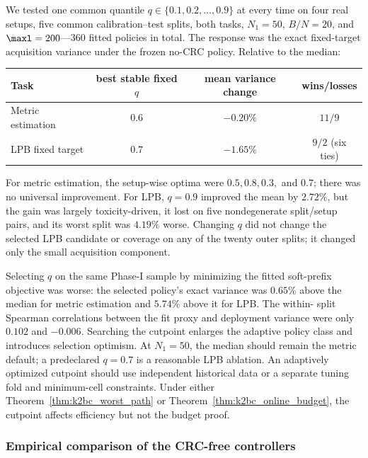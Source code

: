 We tested one common quantile
$q\in\{0.1,0.2,\ldots,0.9\}$ at every time on four real setups, five
common calibration--test splits, both tasks, $N_1=50$, $B/N=20$, and
$\maxl=200$---360 fitted policies in total.  The response was the exact
fixed-target acquisition variance under the frozen no-CRC policy.  Relative
to the median:
\begin{center}
\begin{tabular}{lccc}
\toprule
Task & best stable fixed $q$ & mean variance change & wins/losses\\
\midrule
Metric estimation & $0.6$ & $-0.20\%$ & $11/9$\\
LPB fixed target & $0.7$ & $-1.65\%$ & $9/2$\; (six ties)\\
\bottomrule
\end{tabular}
\end{center}
For metric estimation, the setup-wise optima were $0.5,0.8,0.3,$ and $0.7$;
there was no universal improvement.  For LPB, $q=0.9$ improved the mean by
$2.72\%$, but the gain was largely toxicity-driven, it lost on five
nondegenerate split/setup pairs, and its worst split was $4.19\%$ worse.
Changing $q$ did not change the selected LPB candidate or coverage on any of
the twenty outer splits; it changed only the small acquisition component.

Selecting $q$ on the same Phase-I sample by minimizing the fitted soft-prefix
objective was worse: the selected policy's exact variance was $0.65\%$ above
the median for metric estimation and $5.74\%$ above it for LPB.  The within-
split Spearman correlations between the fit proxy and deployment variance
were only $0.102$ and $-0.006$.  Searching the cutpoint enlarges the adaptive
policy class and introduces selection optimism.  At $N_1=50$, the median
should remain the metric default; a predeclared $q=0.7$ is a reasonable LPB
ablation.  An adaptively optimized cutpoint should use independent historical
data or a separate tuning fold and minimum-cell constraints.  Under either
Theorem~\ref{thm:k2bc_worst_path} or
Theorem~\ref{thm:k2bc_online_budget}, the cutpoint affects efficiency but not
the budget proof.

\subsubsection{Empirical comparison of the CRC-free controllers}
\label{sec:k2bc_experiments}

